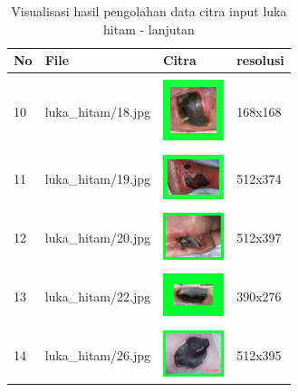 \begin{table}[H]
	\centering
	\caption{Visualisasi hasil pengolahan data citra input luka hitam - lanjutan}
	\label{tabel_input_2}
	\begin{tabular}{|m{0.2in}|m{1.2in}|m{0.7in}|m{0.7in}|}
		\hline
		\textbf{No} & \textbf{File} & \textbf{Citra} & \textbf{resolusi} \\
		\hline
		
		& &  &  \\
		10 & 
		luka\_hitam/18.jpg &
		\includegraphics[width=0.7in]{gambar/dataset_citra/luka_hitam/18.jpg}&
		168x168\\
		\hline
		
		& &  &  \\
		11& 
		luka\_hitam/19.jpg &
		\includegraphics[width=0.7in]{gambar/dataset_citra/luka_hitam/19.jpg}&
		512x374\\
		\hline
		
		& &  &  \\
		12& 
		luka\_hitam/20.jpg &
		\includegraphics[width=0.7in]{gambar/dataset_citra/luka_hitam/20.jpg}&
		512x397\\
		\hline
		
		& &  &  \\
		13& 
		luka\_hitam/22.jpg &
		\includegraphics[width=0.7in]{gambar/dataset_citra/luka_hitam/22.jpg}&
		390x276\\
		\hline
		
		& &  &  \\
		14& 
		luka\_hitam/26.jpg &
		\includegraphics[width=0.7in]{gambar/dataset_citra/luka_hitam/26.jpg}&
		512x395\\
		\hline


\end{tabular}
\end{table}
